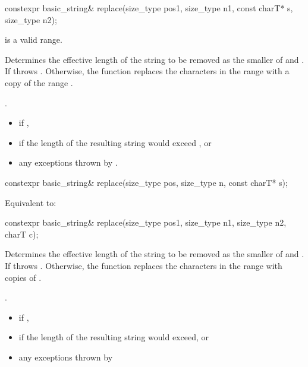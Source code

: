 %
\begin{itemdecl}
constexpr basic_string& replace(size_type pos1, size_type n1, const charT* s, size_type n2);
\end{itemdecl}

\begin{itemdescr}
\pnum
\expects
{} is a valid range.

\pnum
\effects
Determines the effective length  of the string to be
removed as the smaller of  and . If
 throws . Otherwise,
the function replaces the characters in the range
with a copy of the range .

\pnum
\returns
{}.

\pnum
\throws
\begin{itemize}
\item {} if ,
\item {} if the length of the resulting string
would exceed , or
\item any exceptions thrown by .
\end{itemize}
\end{itemdescr}

%
\begin{itemdecl}
constexpr basic_string& replace(size_type pos, size_type n, const charT* s);
\end{itemdecl}

\begin{itemdescr}
\pnum
\effects
Equivalent to: 
\end{itemdescr}

%
\begin{itemdecl}
constexpr basic_string& replace(size_type pos1, size_type n1, size_type n2, charT c);
\end{itemdecl}

\begin{itemdescr}
\pnum
\effects
Determines the effective length  of the string to be
removed as the smaller of  and . If
  throws . Otherwise,
the function replaces the characters in the range
with  copies of .

\pnum
\returns
{}.

\pnum
\throws
\begin{itemize}
\item {} if ,
\item {} if the length of the resulting string
would exceed, or
\item any exceptions thrown by 
\end{itemize}
\end{itemdescr}

